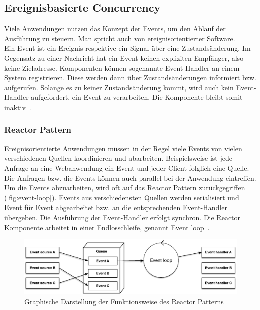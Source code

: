 \pagebreak

\subsection{Ereignisbasierte Concurrency}\label{subsec:eventdriven-concurrency}
Viele Anwendungen nutzen das Konzept der Events, um den Ablauf der Ausführung zu steuern. Man spricht auch von ereignisorientierter Software.\\ 
Ein Event ist ein Ereignis respektive ein Signal über eine Zustandsänderung. Im Gegensatz zu einer Nachricht hat ein Event keinen expliziten Empfänger, also keine Zieladresse. Komponenten können sogenannte Event-Handler an einem System registrieren. Diese werden dann über Zustandsänderungen informiert bzw. aufgerufen. Solange es zu keiner Zustandsänderung kommt, wird auch kein Event-Handler aufgefordert, ein Event zu verarbeiten. Die Komponente bleibt somit inaktiv~\cite[S.~91]{erb_concurrent_2012}.

\subsubsection{Reactor Pattern}
Ereignisorientierte Anwendungen müssen in der Regel viele Events von vielen verschiedenen Quellen koordinieren und abarbeiten. Beispielsweise ist jede Anfrage an eine Webanwendung ein Event und jeder Client folglich eine Quelle. Die Anfragen bzw. die Events können auch parallel bei der Anwendung eintreffen.\\
Um die Events abzuarbeiten, wird oft auf das Reactor Pattern zurückgegriffen (\autoref{fig:event-loop}). Events aus verschiedensten Quellen werden serialisiert und Event für Event abgearbeitet bzw. an die entsprechenden Event-Handler übergeben. Die Ausführung der Event-Handler erfolgt synchron. Die Reactor Komponente arbeitet in einer Endlosschleife, genannt Event loop~\cite[S.~260~-~S.~261]{buschmann_pattern_2011}.

\begin{figure}[H]
 \centering
 \includegraphics[width=1.0\textwidth]{4-Hauptteil/event-loop/event-loop.eps}
 \caption{Graphische Darstellung der Funktionsweise des Reactor Patterns}
 \label{fig:event-loop}
\end{figure}

